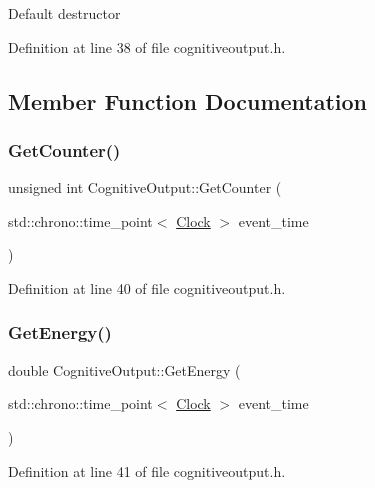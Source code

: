 Default destructor 

Definition at line 38 of file cognitiveoutput.\+h.



\subsection{Member Function Documentation}
\mbox{\label{class_cognitive_output_a73efe6441491eb54df2f4dbd78b3903e}} 
\subsubsection{\texorpdfstring{Get\+Counter()}{GetCounter()}}
{\footnotesize\ttfamily unsigned int Cognitive\+Output\+::\+Get\+Counter (\begin{DoxyParamCaption}\item[{std\+::chrono\+::time\+\_\+point$<$ \mbox{\hyperlink{universe_8h_a0ef8d951d1ca5ab3cfaf7ab4c7a6fd80}{Clock}} $>$}]{event\+\_\+time }\end{DoxyParamCaption})\hspace{0.3cm}{\ttfamily [inline]}}



Definition at line 40 of file cognitiveoutput.\+h.

\mbox{\label{class_cognitive_output_abb923045db565ecdbac431469217cebf}} 
\subsubsection{\texorpdfstring{Get\+Energy()}{GetEnergy()}}
{\footnotesize\ttfamily double Cognitive\+Output\+::\+Get\+Energy (\begin{DoxyParamCaption}\item[{std\+::chrono\+::time\+\_\+point$<$ \mbox{\hyperlink{universe_8h_a0ef8d951d1ca5ab3cfaf7ab4c7a6fd80}{Clock}} $>$}]{event\+\_\+time }\end{DoxyParamCaption})\hspace{0.3cm}{\ttfamily [inline]}}



Definition at line 41 of file cognitiveoutput.\+h.

